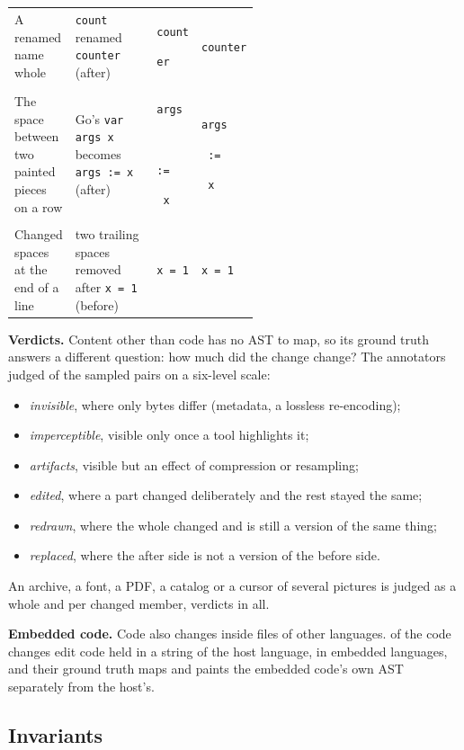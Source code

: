 \documentclass[sigconf,review]{acmart}
\newcommand{\SetMark}[2]{{\setlength{\fboxsep}{0.6pt}\colorbox{#1}{\strut\texttt{#2}}}}
\newcommand{\SetIns}[1]{\SetMark{green!30}{#1}}
\newcommand{\SetUpd}[1]{\SetMark{yellow!55}{#1}}
\newcommand{\SetMov}[1]{\SetMark{blue!22}{#1}}
\newcommand{\SetDel}[1]{{\setlength{\fboxsep}{0.6pt}\fcolorbox{red!70!black}{red!12}{\strut\texttt{#1}}}}
\begin{document}
\begin{table}
\begin{tabular}{@{}>{\raggedright}p{0.2\linewidth}>{\raggedright}p{0.34\linewidth}ll@{}}
    A renamed name whole
      & \texttt{count} renamed \texttt{counter} (after)
      & \texttt{count}\SetUpd{er}
      & \SetUpd{counter} \\ \addlinespace
    The space between two painted pieces on a row
      & Go's \texttt{var args x} becomes \texttt{args := x} (after)
      & \SetMov{args}\texttt{ }\SetIns{:=}\texttt{ x}
      & \SetMov{args}\SetIns{\ :=}\texttt{ x} \\ \addlinespace
    Changed spaces at the end of a line
      & two trailing spaces removed after \texttt{x = 1} (before)
      & \texttt{x = 1\textvisiblespace\textvisiblespace}
      & \texttt{x = 1}\SetDel{\textvisiblespace\textvisiblespace} \\
    \bottomrule
  \end{tabular}
\end{table}

\textbf{Verdicts.} Content other than code has no AST to map, so its ground truth answers a
different question: how much did the change change? The annotators judged \ContentAccAllJudged{}
of the sampled pairs on a six-level scale:
\begin{itemize}
  \item \emph{invisible}, where only bytes differ (metadata, a lossless re-encoding);
  \item \emph{imperceptible}, visible only once a tool highlights it;
  \item \emph{artifacts}, visible but an effect of compression or resampling;
  \item \emph{edited}, where a part changed deliberately and the rest stayed the same;
  \item \emph{redrawn}, where the whole changed and is still a version of the same thing;
  \item \emph{replaced}, where the after side is not a version of the before side.
\end{itemize}
An archive, a font, a PDF, a catalog or a cursor
of several pictures is judged as a whole and per changed member, \ContentAccVerdicts{} verdicts in
all.

\textbf{Embedded code.} Code also changes inside files of other languages. \EmbeddedFixtures{} of
the \NumFixtures{} code changes edit code held in a string of the host language, in
\EmbeddedLanguages{} embedded languages, and their ground truth maps and paints the embedded
code's own AST separately from the host's.

\subsection{Invariants}
\label{sec:invariants}
\end{document}
